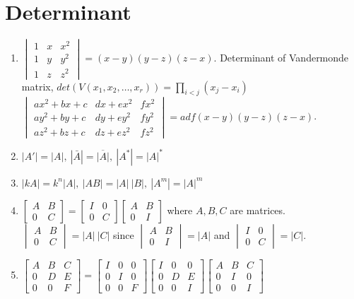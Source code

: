 \section{Determinant}%
\begin{enumerate}
	\item $\begin{vmatrix}1 & x & x^2 \\ 1 & y & y^2 \\ 1 & z & z^2 \end{vmatrix} = (x-y)(y-z)(z-x)$.
		\subitem Determinant of Vandermonde matrix, $det(V(x_1,x_2,\dots,x_r)) = \prod_{i < j} (x_j-x_i)$
		\subitem $\begin{vmatrix}ax^2+bx+c & dx+ex^2 & fx^2 \\ ay^2+by+c & dy+ey^2 & fy^2 \\ az^2+bz+c & dz+ez^2 & fz^2 \end{vmatrix} = adf(x-y)(y-z)(z-x)$.
	\item $|A'| = |A|,\ |\bar{A}|=\overline{|A|},\ |A^\ast| = |A|^\ast$
	\item $|kA| = k^n|A|,\ |AB| = |A|\ |B|,\ |A^m| = |A|^m$
	\item $\begin{bmatrix} A & B \\ 0 & C \end{bmatrix} = \begin{bmatrix} I & 0 \\ 0 & C \end{bmatrix} \begin{bmatrix} A & B \\ 0 & I \end{bmatrix}$ where $A,B,C$ are matrices.
	\subitem $\begin{vmatrix} A & B \\ 0 & C \end{vmatrix} = |A|\ |C|$ since $\begin{vmatrix} A & B \\ 0 & I \end{vmatrix} = |A|$ and $\begin{vmatrix} I & 0 \\ 0 & C \end{vmatrix} = |C|$.
	\item $\begin{bmatrix} A & B & C \\ 0 & D & E \\ 0 & 0 & F \end{bmatrix} = \begin{bmatrix} I & 0 & 0 \\ 0 & I & 0 \\ 0 & 0 & F \end{bmatrix}\begin{bmatrix} I & 0 & 0 \\ 0 & D & E \\ 0 & 0 & I \end{bmatrix} \begin{bmatrix} A & B & C \\ 0 & I & 0 \\ 0 & 0 & I \end{bmatrix}$

\end{enumerate}

